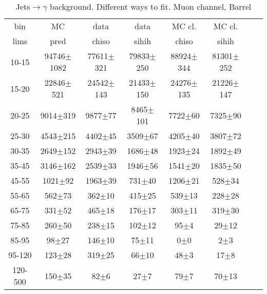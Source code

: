 \begin{table}[h]
  \tiny
  \begin{center}
  \caption{Jets$\rightarrow\gamma$ background. Different ways to fit. Muon channel, Barrel}
  \begin{tabular}{|c|c|c|c|c|c|c|c|}
    bin &  MC   & data  & data  & MC cl. & MC cl.\\ 
    lims & pred & chiso & sihih & chiso  & sihih \\ \hline
10-15 & 94746$\pm$1082 & 77611$\pm$321 & 79833$\pm$250 & 88924$\pm$344 & 81301$\pm$252   \\ \hline
15-20 & 22846$\pm$521 & 24542$\pm$143 & 21433$\pm$150 & 24276$\pm$135 & 21226$\pm$147   \\ \hline
20-25 & 9014$\pm$319 & 9877$\pm$77 & 8465$\pm$101 & 7722$\pm$60 & 7325$\pm$90   \\ \hline
25-30 & 4543$\pm$215 & 4402$\pm$45 & 3509$\pm$67 & 4205$\pm$40 & 3807$\pm$72   \\ \hline
30-35 & 2649$\pm$152 & 2943$\pm$39 & 1686$\pm$48 & 1923$\pm$24 & 1892$\pm$49   \\ \hline
35-45 & 3146$\pm$162 & 2539$\pm$33 & 1946$\pm$56 & 1541$\pm$20 & 1835$\pm$50   \\ \hline
45-55 & 1021$\pm$92 & 1963$\pm$39 & 731$\pm$40 & 1206$\pm$21 & 528$\pm$34   \\ \hline
55-65 & 562$\pm$73 & 362$\pm$10 & 415$\pm$25 & 539$\pm$13 & 228$\pm$28   \\ \hline
65-75 & 331$\pm$52 & 465$\pm$18 & 176$\pm$17 & 303$\pm$11 & 319$\pm$30   \\ \hline
75-85 & 260$\pm$50 & 238$\pm$15 & 102$\pm$12 & 95$\pm$4 & 29$\pm$12   \\ \hline
85-95 & 98$\pm$27 & 146$\pm$10 & 75$\pm$11 & 0$\pm$0 & 2$\pm$3   \\ \hline
95-120 & 123$\pm$28 & 319$\pm$25 & 66$\pm$10 & 48$\pm$3 & 17$\pm$8   \\ \hline
120-500 & 150$\pm$35 & 82$\pm$6 & 27$\pm$7 & 79$\pm$7 & 70$\pm$13   \\ \hline
  \end{tabular}
  \label{tab:Jets_to_gamma_diff_ways_to_fit_0}
  \end{center}
\end{table}

